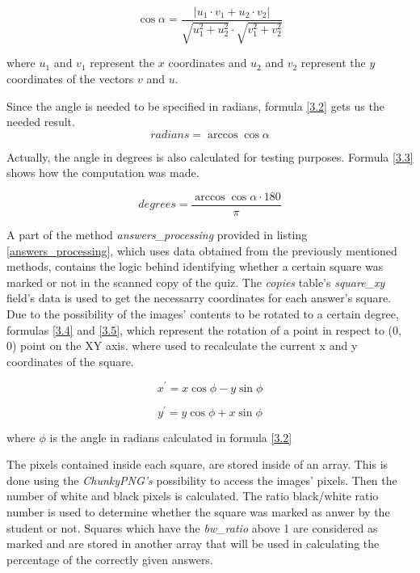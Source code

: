 \begin{equation}
\cos \alpha = \frac{\left\vert u_{1} \cdot v_{1} + u_{2} \cdot v_{2} \right\vert }{\sqrt{u_{1}^{2}+u_{2}^{2}} \cdot \sqrt{v_{1}^{2}+v_{2}^{2}}}  \label{3.1}
\end{equation}

where $u_{1}$ and $v_{1}$ represent the $x$ coordinates and $u_{2}$ and $v_{2}$ represent the $y$ coordinates of the vectors $v$ and $u$.

Since the angle is needed to be specified in radians, formula \ref{3.2} gets us the needed result.
\begin{equation}
radians = \arccos{\cos \alpha} \label{3.2}
\end{equation}

Actually, the angle in degrees is also calculated for testing purposes. Formula \ref{3.3} shows how the computation was made.

\begin{equation}
degrees = \frac{\arccos \cos \alpha \cdot 180}{\pi} \label{3.3}
\end{equation}




A part of the method \textit{answers\_processing} provided in listing \ref{answers_processing}, which uses data obtained from the previously mentioned methods, contains the logic behind identifying whether a certain square was marked or not in the scanned copy of the quiz. The \textit{copies} table's \textit{square\_xy} field's data is used to get the necessarry coordinates for each answer's square. Due to the possibility of the images' contents to be rotated to a certain degree, formulas \ref{3.4} and \ref{3.5}, which represent the rotation of a point in respect to (0, 0) point on the XY axis. where used to recalculate the current x and y coordinates of the square. 

\begin{equation}
x^{\prime} = x \cos \phi - y \sin \phi \label{3.4}
\end{equation}

\begin{equation}
y^{\prime} = y \cos \phi + x \sin \phi \label{3.5}
\end{equation}

where $\phi$ is the angle in radians calculated in formula \ref{3.2}

The pixels contained inside each square, are stored inside of an array. This is done using the \textit{ChunkyPNG's} possibility to access the images' pixels. Then the number of white and black pixels is calculated. The ratio black/white ratio number is used to determine whether the square was marked as anwer by the student or not. Squares which have the \textit{bw\_ratio} above 1 are considered as marked and are stored in another array that will be used in calculating the percentage of the correctly given answers.

